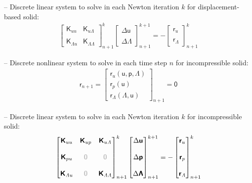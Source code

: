\documentclass[a4paper,12pt]{report}
\newcommand{\bs}[1]{\boldsymbol{#1}}
\newcommand{\zerom}{\textcolor{lightgray}{\bs{\mathsf{0}}}}
\newcommand{\ROP}{\bs{\mathsf{r}}}
\newcommand{\LMZ}{\bs{\mathsf{\Lambda}}}
\newcommand{\lmzi}{\mathit{\Lambda}} %
\begin{document}
-- Discrete linear system to solve in each Newton iteration $k$ for displacement-based solid:
\begin{align}
\begin{bmatrix} \bs{\mathsf{K}}_{uu} & \bs{\mathsf{K}}_{u\lmzi} \\ \\ \bs{\mathsf{K}}_{\lmzi u} & \bs{\mathsf{K}}_{\lmzi\lmzi}\end{bmatrix}_{n+1}^{k}\begin{bmatrix} \Delta\bs{\mathsf{u}} \\ \\ \Delta\LMZ \end{bmatrix}_{n+1}^{k+1}=-\begin{bmatrix} \ROP_{u} \\ \\ \ROP_{\lmzi}\end{bmatrix}_{n+1}^{k} \label{eq:lin_sys_solid_0d}
\end{align}

-- Discrete nonlinear system to solve in each time step $n$ for incompressible solid:
\begin{align}
\ROP_{n+1} = \begin{bmatrix} \ROP_{u}(\bs{\mathsf{u}},\bs{\mathsf{p}},\LMZ) \\ \ROP_{p}(\bs{\mathsf{u}}) \\ \ROP_{\mathit{\Lambda}}(\LMZ,\bs{\mathsf{u}}) \end{bmatrix}_{n+1} = \bs{\mathsf{0}}\label{eq:nonlin_sys_solid_0d_inc}
\end{align}

-- Discrete linear system to solve in each Newton iteration $k$ for incompressible solid:
\begin{align}
\begin{bmatrix} \bs{\mathsf{K}}_{uu} & \bs{\mathsf{K}}_{up} & \bs{\mathsf{K}}_{u\lmzi} \\ \\ \bs{\mathsf{K}}_{pu} & \zerom & \zerom \\ \\  \bs{\mathsf{K}}_{\lmzi u} & \zerom & \bs{\mathsf{K}}_{\lmzi\lmzi}\end{bmatrix}_{n+1}^{k}\begin{bmatrix} \Delta\bs{\mathsf{u}} \\ \\ \Delta\bs{\mathsf{p}} \\ \\ \Delta\LMZ \end{bmatrix}_{n+1}^{k+1}=-\begin{bmatrix} \ROP_{u} \\ \\ \ROP_{p} \\ \\ \ROP_{\lmzi}\end{bmatrix}_{n+1}^{k} \label{eq:lin_sys_solid_incomp_0d}
\end{align}
\end{document}
